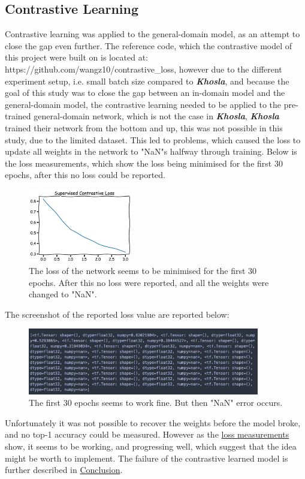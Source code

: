 \subsection{Contrastive Learning}
Contrastive learning was applied to the general-domain model, as an attempt to close the gap even further. The reference code, which the contrastive model of this project were built on is located at: https://github.com/wangz10/contrastive\_loss, however due to the different experiment setup, i.e. small batch size compared to \textbf{\textit{Khosla}}\autocite{khosla2020supervised}, and because the goal of this study was to close the gap between an in-domain model and the general-domain model, the contrastive learning needed to be applied to the pre-trained general-domain network, which is not the case in \textbf{\textit{Khosla}}, \textbf{\textit{Khosla}} trained their network from the bottom and up, this was not possible in this study, due to the limited dataset. This led to problems, which caused the loss to update all weights in the network to "NaN"s halfway through training. Below is the loss measurements, which show the loss being minimised for the first 30 epochs, after this no loss could be reported.

\begin{figure}[H]
    \centering
    \includegraphics[width =0.4\textwidth]{pictures/random/supconlossfail}
    \caption{The loss of the network seems to be minimised for the first 30 epochs. After this no loss were reported, and all the weights were changed to "NaN".}
    \label{ref:supconlossfail}
\end{figure}
The screenshot of the reported loss value are reported below:
\begin{figure}[H]
    \centering
    \includegraphics[width =0.90\textwidth]{pictures/random/supconlosserror}
    \caption{The first 30 epochs seems to work fine. But then "NaN" error occurs.}
    \label{ref:supconlosserror}
\end{figure}
Unfortunately it was not possible to recover the weights before the model broke, and no top-1 accuracy could be measured. However as the \hyperref[ref:supconlossfail]{loss measurements} show, it seems to be working, and progressing well, which suggest that the idea might be worth to implement. The failure of the contrastive learned model is further described in \hyperref[sec:Conclusion]{Conclusion}.

